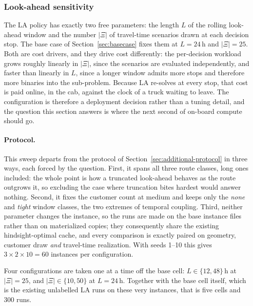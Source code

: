 \subsubsection{Look-ahead sensitivity}
\label{sec:la-config}

The LA policy has exactly two free parameters: the length $L$ of the rolling
look-ahead window and the number $|\Xi|$ of travel-time scenarios drawn at each
decision stop.  The base case of Section~\ref{sec:basecase} fixes them at
$L = 24$\,h and $|\Xi| = 25$.  Both are cost drivers, and they drive cost
differently: the per-decision workload grows roughly linearly in $|\Xi|$, since
the scenarios are evaluated independently, and faster than linearly in $L$,
since a longer window admits more stops and therefore more binaries into the
sub-problem.  Because LA re-solves at every stop, that cost is paid online, in
the cab, against the clock of a truck waiting to leave.  The configuration is
therefore a deployment decision rather than a tuning detail, and the question
this section answers is where the next second of on-board compute should go.

\paragraph{Protocol.}
This sweep departs from the protocol of
Section~\ref{sec:additional-protocol} in three ways, each forced by the
question.  First, it spans all three route classes, long ones included: the
whole point is how a truncated look-ahead behaves as the route outgrows it, so
excluding the case where truncation bites hardest would answer nothing.
Second, it fixes the customer count at medium and keeps only the \emph{none}
and \emph{tight} window classes, the two extremes of temporal coupling.  Third,
neither parameter changes the instance, so the runs are made on the base
instance files rather than on materialized copies; they consequently share the
existing hindsight-optimal cache, and every comparison is exactly paired on
geometry, customer draw \emph{and} travel-time realization.  With seeds
1--10 this gives $3 \times 2 \times 10 = 60$ instances per configuration.

Four configurations are taken one at a time off the base cell: $L \in
\{12, 48\}$\,h at $|\Xi| = 25$, and $|\Xi| \in \{10, 50\}$ at $L = 24$\,h.
Together with the base cell itself, which is the existing unlabelled LA runs on
these very instances, that is five cells and 300 runs.

